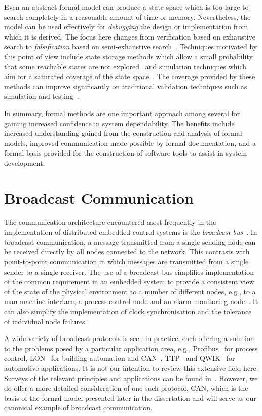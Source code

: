 Even an abstract formal model can produce a state space which is
too large to search completely in a reasonable amount of time or
memory. Nevertheless, the model can be used effectively for
\emph{debugging} the design or implementation from which it is
derived. The focus here changes from verification based on exhaustive
search to \emph{falsification} based on semi-exhaustive
search~\cite{fkf:99}. Techniques motivated by this point of view
include state storage methods which allow a small probability that
some reachable states are not explored~\cite{hol:95,ste:97} and
simulation techniques which aim for a saturated coverage of the state
space~\cite{ga:98,ysa:97}. The coverage provided by these methods can improve
significantly on traditional validation techniques such as simulation
and testing~\cite{mye:79}.

In summary, formal methods are one important approach among several
for gaining increased confidence in system dependability. The benefits
include increased understanding gained from the
construction and analysis of formal models, improved communication
made possible by formal documentation, and a formal basis provided for
the construction of software tools to assist in system development.

\section{Broadcast Communication\label{sec:can}}
The communication architecture encountered most frequently in the
implementation of distributed embedded control systems is the 
\emph{broadcast bus}~\cite{uk:94}. In broadcast communication,
a message transmitted from a single sending node can be received
directly by all nodes connected to the network. This contrasts with
point-to-point communication in which messages are transmitted from a
single sender to a single receiver. The use of a broadcast bus
simplifies implementation of the common requirement in an embedded
system to provide a consistent view of the state of the physical
environment to a number of different nodes, e.g., to a man-machine
interface, a process control node and an alarm-monitoring
node~\cite{kop:97}. It can also simplify the implementation of clock
synchronisation and the tolerance of individual node failures.

A wide variety of broadcast protocols is seen in practice, each
offering a solution to the problems posed by a particular application
area, e.g., Profibus~\cite{din:89} for process control,
LON~\cite{ech:91} for building automation and CAN~\cite{iso:11898},
TTP~\cite{kop:93} and QWIK~\cite{jo:99} for automotive applications.
It is not our intention to review this extensive field here. Surveys
of the relevant principles and applications can be found
in~\cite{kop:97,ks:97,uk:94,ver:97b}. However, we do offer a more
detailed consideration of one such protocol, CAN, which is the basis
of the formal model presented later in the dissertation and will serve
as our canonical example of broadcast communication.

